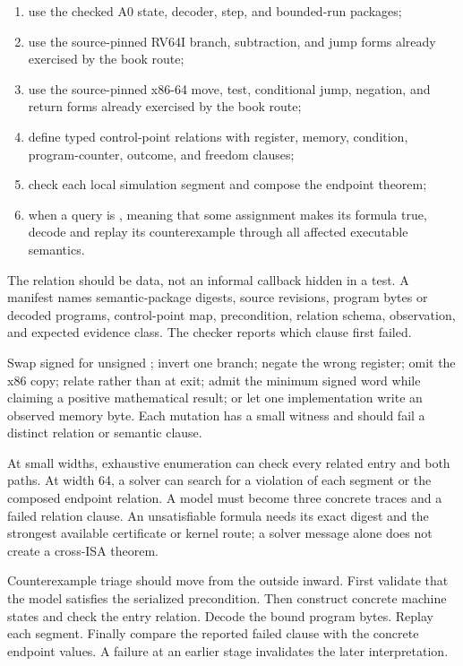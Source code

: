 \begin{enumerate}
\item use the checked A0 state, decoder, step, and bounded-run packages;
\item use the source-pinned RV64I branch, subtraction, and jump forms already
exercised by the book route;
\item use the source-pinned x86-64 move, test, conditional jump, negation, and
return forms already exercised by the book route;
\item define typed control-point relations with register, memory, condition,
program-counter, outcome, and freedom clauses;
\item check each local simulation segment and compose the endpoint theorem;
\item when a query is , meaning that some assignment
makes its formula true, decode and replay its counterexample through all affected
executable semantics.
\end{enumerate}

The relation should be data, not an informal callback hidden in a test. A
manifest names semantic-package digests, source revisions, program bytes or
decoded programs, control-point map, precondition, relation schema, observation,
and expected evidence class. The checker reports which clause first failed.

\begin{example}[title={Negative controls for the absolute-value simulation}]
Swap signed  for unsigned ; invert one branch; negate the
wrong register; omit the x86 copy; relate  rather than  at
exit; admit the minimum signed word while claiming a positive mathematical
result; or let one implementation write an observed memory byte. Each mutation
has a small witness and should fail a distinct relation or semantic clause.
\end{example}

At small widths, exhaustive enumeration can check every related entry and
both paths. At width 64, a solver can search for a violation of each segment
or the composed endpoint relation. A model must become three concrete traces
and a failed relation clause. An unsatisfiable formula needs its exact digest
and the strongest available certificate or kernel route; a solver message
alone does not create a cross-ISA theorem.

Counterexample triage should move from the outside inward. First validate that
the model satisfies the serialized precondition. Then construct concrete
machine states and check the entry relation. Decode the bound program bytes.
Replay each segment. Finally compare the reported failed clause with the
concrete endpoint values. A failure at an earlier stage invalidates the later
interpretation.

